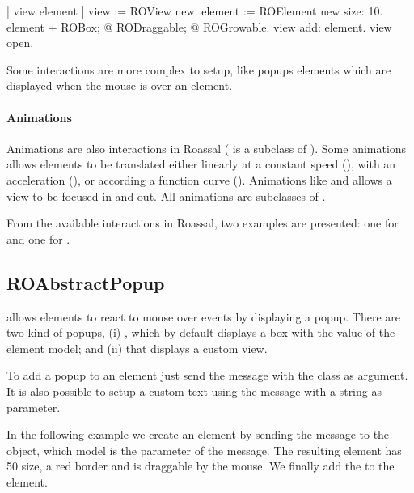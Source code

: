 \documentclass[a4paper,10pt,twoside]{book}
\begin{document}
\begin{code}{}
| view element |
view := ROView new.
element := ROElement new size: 10.
element 
	+ ROBox;
	@ RODraggable; 
	@ ROGrowable.
view add: element.
view open.
\end{code}


Some interactions are more complex to setup, like popups elements which are displayed when the mouse is over an element. 

\paragraph{Animations} Animations are also interactions in Roassal (\ie {} is a subclass of ). Some animations allows elements to be translated either linearly at a constant speed (), with an acceleration (), or according a function curve (). Animations like  and  allows a view to be focused in and out. All animations are subclasses of .

From the available interactions in Roassal, two examples are presented: one for  and one for .

\subsection*{ROAbstractPopup}

 allows elements to react to mouse over events by displaying a popup. There are two kind of popups, (i) , which by default displays a box with the  value of the element model; and (ii)  that displays a custom view.

To add a popup to an element just send the  message with the  class as argument. It is also possible to setup a custom text using the  message with a string as parameter. 

In the following example we create an element by sending the  message to the  object, which model is the parameter of the message. The resulting element has 50 size, a red border and is draggable by the mouse. We finally add the  to the element.
\end{document}
